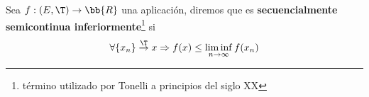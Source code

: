 \begin{definicion}
    Sea $f:(E,\T)\to \bb{R}$ una aplicación, diremos que es \textbf{secuencialmente semicontinua inferiormente}\footnote{término utilizado por Tonelli a principios del siglo XX} si 
    \begin{gather*}
        \forall \{x_n\} \overset{\T}{\to} x \Rightarrow f(x) \leq \liminf\limits_{n\to \infty} f(x_n)
    \end{gather*}
\end{definicion}